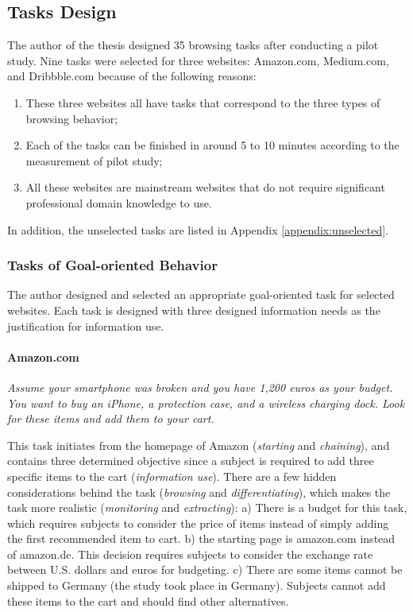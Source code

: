 \subsection{Tasks Design}
\label{sec:task-design}

The author of the thesis designed 35 browsing tasks after conducting a pilot study. 
Nine tasks were selected for three websites: Amazon.com, Medium.com, and Dribbble.com 
because of the following reasons:

\begin{enumerate}
    \item These three websites all have tasks that correspond to the three types of browsing behavior;
    \item Each of the tasks can be finished in around 5 to 10 minutes according to the measurement of pilot study;
    \item All these websites are mainstream websites that do not require 
        significant professional domain knowledge to use.
\end{enumerate}

In addition, the unselected tasks are listed in Appendix \ref{appendix:unselected}.

\subsubsection{Tasks of Goal-oriented Behavior}

The author designed and selected an appropriate goal-oriented task for selected websites.
Each task is designed with three designed information needs as
the justification for information use.

\paragraph{Amazon.com} \emph{Assume your smartphone was broken and you have 1,200 euros 
    as your budget. You want to buy an iPhone, a protection case, and a wireless 
    charging dock. Look for these items and add them to your cart.}

This task initiates from the homepage of Amazon (\emph{starting} and \emph{chaining}), 
and contains three determined objective since 
a subject is required to add three specific items to the cart (\emph{information use}). 
There are a few hidden considerations behind the task (\emph{browsing} and \emph{differentiating}),
which makes the task more realistic (\emph{monitoring} and \emph{extracting}): 
a) There is a budget for this task, which requires subjects to consider the
price of items instead of simply adding the first recommended item to cart. 
b) the starting page is amazon.com instead of amazon.de. This decision requires
subjects to consider the exchange rate between U.S. dollars and euros for budgeting.
c) There are some items cannot be shipped to Germany (the study took place in Germany).
Subjects cannot add these items to the cart and should find other alternatives.

